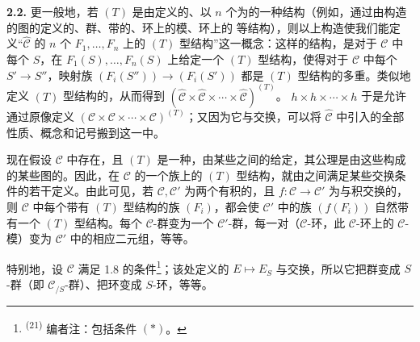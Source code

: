 \textbf{2.2.} 更一般地，若 $(T)$ 是由定义的、以 $n$ 个为的一种结构（例如，通过由构造的图的定义的、群、带的、环上的模、环上的 等结构），则以上构造使我们能定义“$\widehat{\mathcal C}$ 的 $n$ 个 $F_1,\ldots,F_n$ 上的 $(T)$ 型结构”这一概念：这样的结构，是对于 $\mathcal C$ 中每个 $S$，在 $F_1(S),\ldots,F_n(S)$ 上给定一个 $(T)$ 型结构，使得对于 $\mathcal C$ 中每个 $S'\to S''$，映射族 $(F_i(S''))\to(F_i(S'))$ 都是 $(T)$ 型结构的多重。类似地定义 $(T)$ 型结构的，从而得到 $(\widehat{\mathcal C}\times\widehat{\mathcal C}\times\cdots\times\widehat{\mathcal C})^{(T)}$。 $h\times h\times\cdots\times h$ 于是允许通过原像定义 $(\mathcal C\times\mathcal C\times\cdots\times\mathcal C)^{(T)}$；又因为它与交换，可以将 $\widehat{\mathcal C}$ 中引入的全部性质、概念和记号搬到这一中。

现在假设 $\mathcal C$ 中存在，且 $(T)$ 是一种，由某些之间的给定，其公理是由这些构成的某些图的。因此，在 $\mathcal C$ 的一个族上的 $(T)$ 型结构，就由之间满足某些交换条件的若干定义。由此可见，若 $\mathcal C,\mathcal C'$ 为两个有积的，且 $f:\mathcal C\to\mathcal C'$ 为与积交换的，则 $\mathcal C$ 中每个带有 $(T)$ 型结构的族 $(F_i)$，都会使 $\mathcal C'$ 中的族 $(f(F_i))$ 自然带有一个 $(T)$ 型结构。每个 $\mathcal C$-群变为一个 $\mathcal C'$-群，每一对（$\mathcal C$-环，此 $\mathcal C$-环上的 $\mathcal C$-模）变为 $\mathcal C'$ 中的相应二元组，等等。

特别地，设 $\mathcal C$ 满足 1.8 的条件\footnote{\textsuperscript{(21)} 编者注：包括条件 $(*)$。}；该处定义的 $E\mapsto E_S$ 与交换，所以它把群变成 $S$-群（即 $\mathcal C_{/S}$-群）、把环变成 $S$-环，等等。

